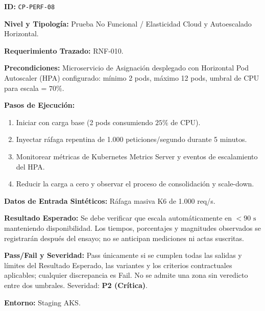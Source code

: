 \par\noindent\textbf{ID:} \texttt{C\allowbreak{}P\allowbreak{}-\allowbreak{}P\allowbreak{}E\allowbreak{}R\allowbreak{}F\allowbreak{}-\allowbreak{}0\allowbreak{}8\allowbreak{}}\par
\par\noindent\textbf{Nivel y Tipología:} Prueba No Funcional / Elasticidad Cloud y Autoescalado Horizontal.\par
\par\noindent\textbf{Requerimiento Trazado:} RNF-010.\par
\par\noindent\textbf{Precondiciones:} Microservicio de Asignación desplegado con Horizontal Pod Autoscaler (HPA) configurado: mínimo 2 pods, máximo 12 pods, umbral de CPU para escala = \(70\%\).\par
\par\noindent\textbf{Pasos de Ejecución:} \par
\begin{enumerate}
\item Iniciar con carga base (2 pods consumiendo \(25\%\) de CPU).
\item Inyectar ráfaga repentina de 1.000 peticiones/segundo durante 5 minutos.
\item Monitorear métricas de Kubernetes Metrics Server y eventos de escalamiento del HPA.
\item Reducir la carga a cero y observar el proceso de consolidación y scale-down.
\end{enumerate}
\par\noindent\textbf{Datos de Entrada Sintéticos:} Ráfaga masiva K6 de 1.000 req/s.\par
\par\noindent\textbf{Resultado Esperado:} Se debe verificar que escala automáticamente en \(< 90\text{ s}\) manteniendo disponibilidad. Los tiempos, porcentajes y magnitudes observados se registrarán después del ensayo; no se anticipan mediciones ni actas suscritas.\par
\par\noindent\textbf{Pass/Fail y Severidad:} Pass únicamente si se cumplen todas las salidas y límites del Resultado Esperado, las variantes y los criterios contractuales aplicables; cualquier discrepancia es Fail. No se admite una zona sin veredicto entre dos umbrales. Severidad: \textbf{P2 (Crítica)}.\par
\par\noindent\textbf{Entorno:} Staging AKS.\par







